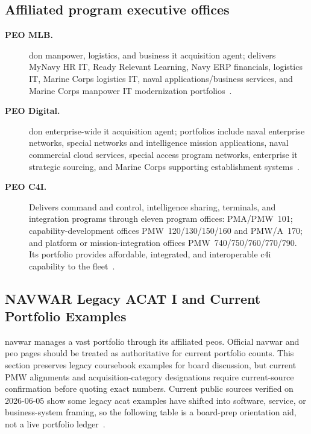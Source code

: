 \documentclass[../main.tex]{subfiles}
\begin{document}
\subsection{Affiliated program executive offices}
\begin{description}
  \item[\textbf{PEO MLB.}] \ac{don} manpower, logistics, and business \ac{it} acquisition agent; delivers MyNavy HR IT, Ready Relevant Learning, Navy ERP financials, logistics IT, Marine Corps logistics IT, naval applications/business services, and Marine Corps manpower IT modernization portfolios~\autocite{edo-2-1-3-navwar-enterprise-2024,PEOMLB-portfolio-book-2025}.
  \item[\textbf{PEO Digital.}] \ac{don} enterprise-wide \ac{it} acquisition agent; portfolios include naval enterprise networks, special networks and intelligence mission applications, naval commercial cloud services, special access program networks, enterprise \ac{it} strategic sourcing, and Marine Corps supporting establishment systems~\autocite{edo-2-1-3-navwar-enterprise-2024}.
  \item[\textbf{PEO C4I.}] Delivers command and control, intelligence sharing, terminals, and integration programs through eleven program offices: PMA/PMW~101; capability-development offices PMW~120/130/150/160 and PMW/A~170; and platform or mission-integration offices PMW~740/750/760/770/790. Its portfolio provides affordable, integrated, and interoperable \ac{c4i} capability to the fleet~\autocite{edo-2-1-3-navwar-enterprise-2024,PEOC4I-program-offices-2026}.
\end{description}

\subsection{NAVWAR Legacy ACAT I and Current Portfolio Examples}
\label{subsec:navwar-acat-i}

\ac{navwar} manages a vast portfolio through its affiliated \acp{peo}. Official \ac{navwar} and \ac{peo} pages should be treated as authoritative for current portfolio counts. This section preserves legacy coursebook examples for board discussion, but current PMW alignments and acquisition-category designations require current-source confirmation before quoting exact numbers. Current public sources verified on 2026-06-05 show some legacy \ac{acat} examples have shifted into software, service, or business-system framing, so the following table is a board-prep orientation aid, not a live portfolio ledger~\autocite{navwar-who-we-are-2026,PEOC4I-program-offices-2026,PEOC4I-PMW120-tearsheet-2026,PEOC4I-PMW150-tearsheet-2026,PEOC4I-PMW160-tearsheet-2025,PEOC4I-PMW170-tearsheet-2025,PEOC4I-PMW790-tearsheet-2025,PEODigital-portfolio-overview-2023,PEOMLB-portfolio-book-2025,DAU-MDAP-Changes-2024}.
\end{document}
